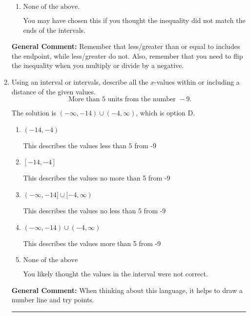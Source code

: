 \documentclass{extbook}[14pt]
\newcommand{\litem}[1]{\item #1

\rule{\textwidth}{0.4pt}}
\begin{document}
\begin{enumerate}
{\begin{enumerate}[label=\Alph*.]
* $[-0.188, \infty)$, which is the correct option.
\item \( \text{None of the above}. \)

You may have chosen this if you thought the inequality did not match the ends of the intervals.
\end{enumerate}

\textbf{General Comment:} Remember that less/greater than or equal to includes the endpoint, while less/greater do not. Also, remember that you need to flip the inequality when you multiply or divide by a negative.
}
\litem{
Using an interval or intervals, describe all the $x$-values within or including a distance of the given values.
\[ \text{ More than } 5 \text{ units from the number } -9. \]

The solution is \( (-\infty, -14) \cup (-4, \infty) \), which is option D.\begin{enumerate}[label=\Alph*.]
\item \( (-14, -4) \)

This describes the values less than 5 from -9
\item \( [-14, -4] \)

This describes the values no more than 5 from -9
\item \( (-\infty, -14] \cup [-4, \infty) \)

This describes the values no less than 5 from -9
\item \( (-\infty, -14) \cup (-4, \infty) \)

This describes the values more than 5 from -9
\item \( \text{None of the above} \)

You likely thought the values in the interval were not correct.
\end{enumerate}

\textbf{General Comment:} When thinking about this language, it helps to draw a number line and try points.
}
\end{enumerate}
\end{document}
